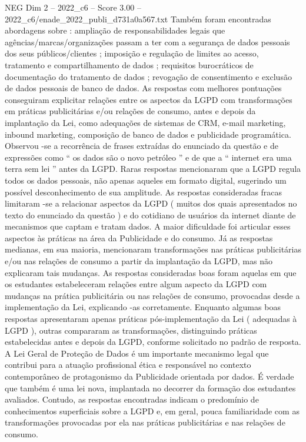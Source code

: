 \begin{textsample}{NEG Dim 2 – 2022\_c6 – Score 3.00 – 2022\_c6/enade\_2022\_publi\_d731a0a567.txt}
Também foram encontradas abordagens sobre : ampliação de responsabilidades legais que agências/marcas/organizações passam a ter com a segurança de dados pessoais dos seus públicos/clientes ; imposição e regulação de limites ao acesso, tratamento e compartilhamento de dados ; requisitos burocráticos de documentação do tratamento de dados ; revogação de consentimento e exclusão de dados pessoais de banco de dados.
As respostas com melhores pontuações conseguiram explicitar relações entre os aspectos da LGPD com transformações em práticas publicitárias e/ou relações de consumo, antes e depois da implantação da Lei, como adequações de sistemas de CRM, e-mail marketing, inbound marketing, composição de banco de dados e publicidade programática.
Observou -se a recorrência de frases extraídas do enunciado da questão e de expressões como “ os dados são o novo petróleo ” e de que a “ internet era uma terra sem lei ” antes da LGPD.
Raras respostas mencionaram que a LGPD regula todos os dados pessoais, não apenas aqueles em formato digital, sugerindo um possível desconhecimento de sua amplitude.
As respostas consideradas fracas limitaram -se a relacionar aspectos da LGPD ( muitos dos quais apresentados no texto do enunciado da questão ) e do cotidiano de usuários da internet diante de mecanismos que captam e tratam dados.
A maior dificuldade foi articular esses aspectos às práticas na área da Publicidade e do consumo.
Já as respostas medianas, em sua maioria, mencionaram transformações nas práticas publicitárias e/ou nas relações de consumo a partir da implantação da LGPD, mas não explicaram tais mudanças.
As respostas consideradas boas foram aquelas em que os estudantes estabeleceram relações entre algum aspecto da LGPD com mudanças na prática publicitária ou nas relações de consumo, provocadas desde a implementação da Lei, explicando -as corretamente.
Enquanto algumas boas respostas apresentaram apenas práticas pós-implementação da Lei ( adequadas à LGPD ), outras compararam as transformações, distinguindo práticas estabelecidas antes e depois da LGPD, conforme solicitado no padrão de resposta.
A Lei Geral de Proteção de Dados é um importante mecanismo legal que contribui para a atuação profissional ética e responsável no contexto contemporâneo de protagonismo da Publicidade orientada por dados.
É verdade que também é uma lei nova, implantada no decorrer da formação dos estudantes avaliados.
Contudo, as respostas encontradas indicam o predomínio de conhecimentos superficiais sobre a LGPD e, em geral, pouca familiaridade com as transformações provocadas por ela nas práticas publicitárias e nas relações de consumo.

\end{textsample}
